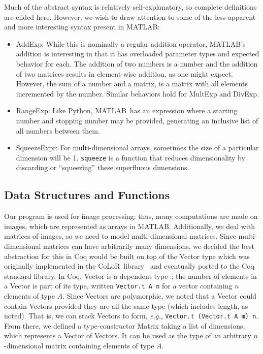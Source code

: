 \documentclass[11pt,conference]{IEEEtran}
\newcommand{\matlab}{MATLAB}
\newcommand{\mmatlab}{\textmu\matlab}
\newcommand{\colorlib}{CoLoR}
\begin{document}
Much of the abstract syntax is relatively self-explanatory, so complete
definitions are elided here. However, we wish to draw attention to some of the
less apparent and more interesting syntax present in \mmatlab\@:

\begin{itemize}

    \item \textsf{AddExp}: While this is nominally a regular addition operator,
        \matlab's addition is interesting in that it has overloaded parameter
        types and expected behavior for each. The addition of two numbers is a
        number and the addition of two matrices results in element-wise
        addition, as one might expect. However, the sum of a number and a
        matrix, is a matrix with all elements incremented by the number. Similar
        behaviors hold for \textsf{MultExp} and \textsf{DivExp}.

    \item \textsf{RangeExp}: Like Python, \matlab\ has an expression where a
        starting number and stopping number may be provided, generating an
        inclusive list of all numbers between them.

    \item \textsf{SqueezeExpr}: For multi-dimensional arrays, sometimes the size
        of a particular dimension will be 1. \texttt{squeeze} is a function that
        reduces dimensionality by discarding or ``squeezing'' these superfluous
        dimensions.

\end{itemize}

\subsection{Data Structures and Functions}

Our program is used for image processing; thus, many computations are made on
images, which are represented as arrays in \matlab\@. Additionally, we deal with
matrices of images, so we need to model multi-dimensional matrices. Since
multi-dimensional matrices can have arbitrarily many dimensions, we decided the
best abstraction for this in Coq would be built on top of the \textsf{Vector}
type which was originally implemented in the \colorlib\
library~\cite{BLANQUI_2011} and eventually ported to the Coq standard library.
In Coq, \textsf{Vector} is a dependent type~\cite{Bove2009,Thorsten_2010}; the
number of elements in a \textsf{Vector} is part of its type, written
\texttt{Vector.t A n} for a vector containing \(n\) elements of type \(A\).
Since \textsf{Vector}s are polymorphic, we noted that a \textsf{Vector} could
contain \textsf{Vector}s provided they are all the same type (which includes
length, as noted). That is, we can stack \textsf{Vector}s to form, \emph{e.g.},
\texttt{Vector.t (Vector.t A m) n}. From there, we defined a type-constructor
\textsf{Matrix} taking a list of dimensions, which represents a \textsf{Vector}
of \textsf{Vector}s. It can be used as the type of an arbitrary
\(n\)-dimensional matrix containing elements of type \(A\).
\end{document}
